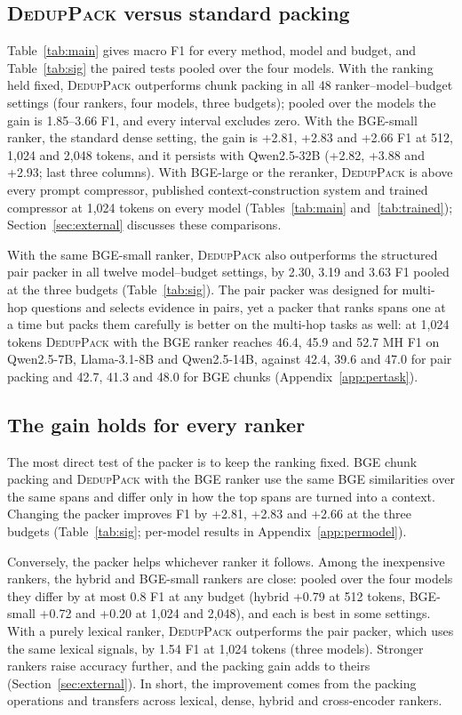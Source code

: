 \documentclass[11pt]{article}
\newcommand{\spk}{\textsc{DedupPack}}
\begin{document}
\subsection{\spk{} versus standard packing}
Table~\ref{tab:main} gives macro F1 for every method, model and budget, and Table~\ref{tab:sig} the paired tests pooled over the four models. With the ranking held fixed, \spk{} outperforms chunk packing in all 48 ranker--model--budget settings (four rankers, four models, three budgets); pooled over the models the gain is 1.85--3.66 F1, and every interval excludes zero. With the BGE-small ranker, the standard dense setting, the gain is +2.81, +2.83 and +2.66 F1 at 512, 1,024 and 2,048 tokens, and it persists with Qwen2.5-32B (+2.82, +3.88 and +2.93; last three columns). With BGE-large or the reranker, \spk{} is above every prompt compressor, published context-construction system and trained compressor at 1,024 tokens on every model (Tables~\ref{tab:main} and~\ref{tab:trained}); Section~\ref{sec:external} discusses these comparisons.

With the same BGE-small ranker, \spk{} also outperforms the structured pair packer in all twelve model--budget settings, by 2.30, 3.19 and 3.63 F1 pooled at the three budgets (Table~\ref{tab:sig}). The pair packer was designed for multi-hop questions and selects evidence in pairs, yet a packer that ranks spans one at a time but packs them carefully is better on the multi-hop tasks as well: at 1,024 tokens \spk{} with the BGE ranker reaches 46.4, 45.9 and 52.7 MH F1 on Qwen2.5-7B, Llama-3.1-8B and Qwen2.5-14B, against 42.4, 39.6 and 47.0 for pair packing and 42.7, 41.3 and 48.0 for BGE chunks (Appendix~\ref{app:pertask}).

\subsection{The gain holds for every ranker}
\label{sec:agnostic}
The most direct test of the packer is to keep the ranking fixed. BGE chunk packing and \spk{} with the BGE ranker use the same BGE similarities over the same spans and differ only in how the top spans are turned into a context. Changing the packer improves F1 by +2.81, +2.83 and +2.66 at the three budgets (Table~\ref{tab:sig}; per-model results in Appendix~\ref{app:permodel}).

Conversely, the packer helps whichever ranker it follows. Among the inexpensive rankers, the hybrid and BGE-small rankers are close: pooled over the four models they differ by at most 0.8 F1 at any budget (hybrid +0.79 at 512 tokens, BGE-small +0.72 and +0.20 at 1,024 and 2,048), and each is best in some settings. With a purely lexical ranker, \spk{} outperforms the pair packer, which uses the same lexical signals, by 1.54 F1 at 1,024 tokens (three models). Stronger rankers raise accuracy further, and the packing gain adds to theirs (Section~\ref{sec:external}). In short, the improvement comes from the packing operations and transfers across lexical, dense, hybrid and cross-encoder rankers.
\end{document}
